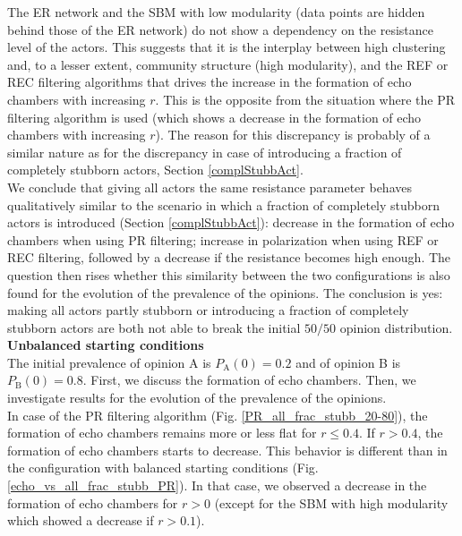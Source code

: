 \documentclass[11 pt , letterpaper , twoside , openright]{book}
\begin{document}
\newline
The ER network and the SBM with low modularity (data points are hidden behind those of the ER network) do not show a dependency on the resistance level of the actors. This suggests that it is the interplay between high clustering and, to a lesser extent, community structure (high modularity), and the REF or REC filtering algorithms that drives the increase in the formation of echo chambers with increasing $r$. This is the opposite from the situation where the PR filtering algorithm is used (which shows a decrease in the formation of echo chambers with increasing $r$). The reason for this discrepancy is probably of a similar nature as for the discrepancy in case of introducing a fraction of completely stubborn actors, Section \ref{complStubbAct}.\\
\newline
We conclude that giving all actors the same resistance parameter behaves qualitatively similar to the scenario in which a fraction of completely stubborn actors is introduced (Section \ref{complStubbAct}): decrease in the formation of echo chambers when using PR filtering; increase in polarization when using REF or REC filtering, followed by a decrease if the resistance becomes high enough. The question then rises whether this similarity between the two configurations is also found for the evolution of the prevalence of the opinions. The conclusion is yes: making all actors partly stubborn or introducing a fraction of completely stubborn actors are both not able to break the initial $50/50$ opinion distribution.\\
\newline
\textbf{Unbalanced starting conditions}\\
\newline
The initial prevalence of opinion A is $P_\text{A}(0) = 0.2$ and of opinion B is $P_\text{B}(0) = 0.8$. First, we discuss the formation of echo chambers. Then, we investigate results for the evolution of the prevalence of the opinions.\\
\newline
In case of the PR filtering algorithm (Fig. \ref{PR_all_frac_stubb_20-80}), the formation of echo chambers remains more or less flat for $r \leqslant 0.4$. If $r > 0.4$, the formation of echo chambers starts to decrease. This behavior is different than in the configuration with balanced starting conditions (Fig. \ref{echo_vs_all_frac_stubb_PR}). In that case, we observed a decrease in the formation of echo chambers for $r > 0$ (except for the SBM with high modularity which showed a decrease if $r>0.1$).\\
\end{document}
